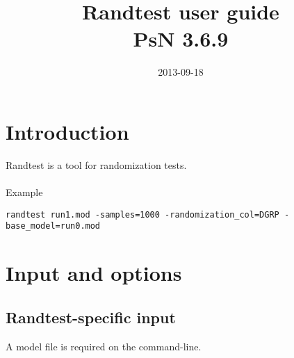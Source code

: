 \documentclass[a4paper,12pt]{article}
\title{Randtest user guide\\ \vspace{2 mm} {\large PsN 3.6.9}}
\date{2013-09-18}
\begin{document}
\maketitle


\section{Introduction}

Randtest is a tool for randomization tests.
\\
\\
Example
\begin{verbatim}
randtest run1.mod -samples=1000 -randomization_col=DGRP -base_model=run0.mod
\end{verbatim}

\section{Input and options}

\subsection{Randtest-specific input}

A model file is required on the command-line.
\end{document}
